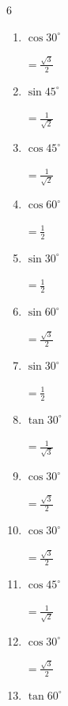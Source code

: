 \begin{multicols}{6}
\begin{enumerate}
  \item $\displaystyle \cos{30^\circ}$

        $\displaystyle =\frac{\sqrt{3}}{2}$

  \item $\displaystyle \sin{45^\circ}$

        $\displaystyle =\frac{1}{\sqrt{2}}$

  \item $\displaystyle \cos{45^\circ}$

        $\displaystyle =\frac{1}{\sqrt{2}}$

  \item $\displaystyle \cos{60^\circ}$

        $\displaystyle =\frac{1}{2}$

\columnbreak %

  \item $\displaystyle \sin{30^\circ}$

        $\displaystyle =\frac{1}{2}$

  \item $\displaystyle \sin{60^\circ}$

        $\displaystyle =\frac{\sqrt{3}}{2}$

  \item $\displaystyle \sin{30^\circ}$

        $\displaystyle =\frac{1}{2}$

  \item $\displaystyle \tan{30^\circ}$

        $\displaystyle =\frac{1}{\sqrt{3}}$

  \item $\displaystyle \cos{30^\circ}$

        $\displaystyle =\frac{\sqrt{3}}{2}$

  \item $\displaystyle \cos{30^\circ}$

        $\displaystyle =\frac{\sqrt{3}}{2}$

  \item $\displaystyle \cos{45^\circ}$

        $\displaystyle =\frac{1}{\sqrt{2}}$

  \item $\displaystyle \cos{30^\circ}$

        $\displaystyle =\frac{\sqrt{3}}{2}$

  \item $\displaystyle \tan{60^\circ}$


\end{enumerate}
\end{multicols}
